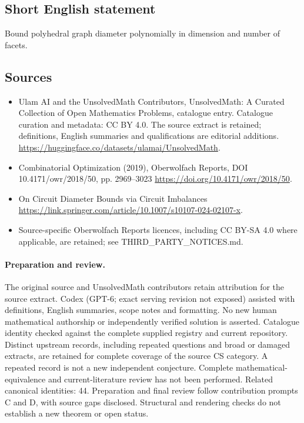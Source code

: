 \documentclass[11pt]{article}
\begin{document}
\subsection{Short English statement}
Bound polyhedral graph diameter polynomially in dimension and number of facets.
\subsection{Sources}
\begin{itemize}
\item[\hypertarget{source:statement:1}{S1}] Ulam AI and the UnsolvedMath Contributors, UnsolvedMath: A Curated Collection of Open Mathematics Problems, catalogue entry. Catalogue curation and metadata: CC BY 4.0. The source extract is retained; definitions, English summaries and qualifications are editorial additions.
\url{https://huggingface.co/datasets/ulamai/UnsolvedMath}.
\item[\hypertarget{source:statement:2}{S2}] Combinatorial Optimization (2019), Oberwolfach Reports, DOI 10.4171/owr/2018/50, pp. 2969--3023
\url{https://doi.org/10.4171/owr/2018/50}.
\item[\hypertarget{source:statement:3}{S3}] On Circuit Diameter Bounds via Circuit Imbalances
\url{https://link.springer.com/article/10.1007/s10107-024-02107-x}.
\item Source-specific Oberwolfach Reports licences, including CC BY-SA 4.0 where applicable, are retained; see THIRD\_PARTY\_NOTICES.md.
\end{itemize}
\paragraph{Preparation and review.}
The original source and UnsolvedMath contributors retain attribution for the source extract. Codex (GPT-6; exact serving revision not exposed) assisted with definitions, English summaries, scope notes and formatting. No new human mathematical authorship or independently verified solution is asserted. Catalogue identity checked against the complete supplied registry and current repository. Distinct upstream records, including repeated questions and broad or damaged extracts, are retained for complete coverage of the source CS category. A repeated record is not a new independent conjecture. Complete mathematical-equivalence and current-literature review has not been performed. Related canonical identities: 44. Preparation and final review follow contribution prompts C and D, with source gaps disclosed. Structural and rendering checks do not establish a new theorem or open status.
\label{end:statement}
\end{document}
